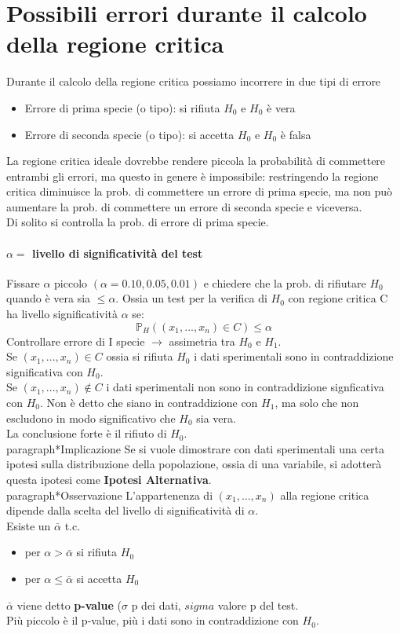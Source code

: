 \section{Possibili errori durante il calcolo della regione critica}
Durante il calcolo della regione critica possiamo incorrere in due tipi di errore
\begin{itemize}
    \item Errore di prima specie (o tipo): si rifiuta $H_0$ e $H_0$ è vera
    \item Errore di seconda specie (o tipo): si accetta $H_0$ e $H_0$ è falsa
\end{itemize}
La regione critica ideale dovrebbe rendere piccola la probabilità di commettere
entrambi gli errori, ma questo in genere è impossibile: restringendo la regione
critica diminuisce la prob. di commettere un errore di prima specie, ma non
può aumentare la prob. di commettere un errore di seconda specie e viceversa.
\\ Di solito si controlla la prob. di errore di prima specie.
\paragraph*{$\alpha =$ livello di significatività del test} Fissare $\alpha$ piccolo
$(\alpha = 0.10, 0.05, 0.01)$ e chiedere che la prob. di rifiutare $H_0$ quando è
vera sia $\leq \alpha$. Ossia un test per la verifica di $H_0$ con regione critica C
ha livello significatività $\alpha$ se:
\begin{equation}
    \mathbb{P}_H((x_1, ..., x_n)\in C) \leq \alpha
\end{equation}
Controllare errore di I specie $\rightarrow$ assimetria tra $H_0$ e $H_1$.
\\ Se $(x_1, ..., x_n) \in C$ ossia si rifiuta $H_0$ i dati sperimentali sono
in contraddizione significativa con $H_0$.
\\ Se $(x_1, ..., x_n) \notin C$ i dati sperimentali non sono
in contraddizione signficativa con $H_0$.
Non è detto che siano in contraddizione con $H_1$, ma solo che non escludono
in modo significativo che $H_0$ sia vera.
\\ La conclusione forte è il rifiuto di $H_0$.
\\paragraph*{Implicazione} Se si vuole dimostrare con dati sperimentali una certa ipotesi
sulla distribuzione della popolazione, ossia di una variabile, si adotterà questa
ipotesi come \textbf{Ipotesi Alternativa}.
\\paragraph*{Osservazione} L'appartenenza di $(x_1, ..., x_n)$ alla regione
critica dipende dalla scelta del livello di significatività di $\alpha$.
\\ Esiste un $\bar{\alpha}$ t.c.
\begin{itemize}
    \item per $\alpha > \bar{\alpha}$ si rifiuta $H_0$
    \item per $\alpha \leq \bar{\alpha}$ si accetta $H_0$
\end{itemize}
$\bar{\alpha}$ viene detto \textbf{p-value} ($\sigma$ p dei dati, $sigma$ valore p
del test.
\\ Più piccolo è il p-value, più i dati sono in contraddizione con $H_0$.
